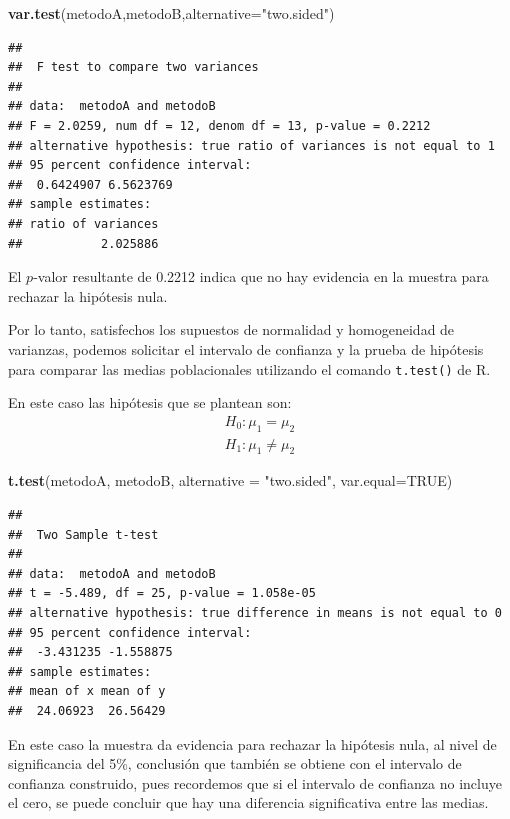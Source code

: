 \documentclass[
]{book}
\newenvironment{Shaded}{\begin{snugshade}}{\end{snugshade}}
\newcommand{\AttributeTok}[1]{\textcolor[rgb]{0.13,0.29,0.53}{#1}}
\newcommand{\ConstantTok}[1]{\textcolor[rgb]{0.56,0.35,0.01}{#1}}
\newcommand{\FunctionTok}[1]{\textcolor[rgb]{0.13,0.29,0.53}{\textbf{#1}}}
\newcommand{\NormalTok}[1]{#1}
\newcommand{\StringTok}[1]{\textcolor[rgb]{0.31,0.60,0.02}{#1}}
\begin{document}
\begin{Shaded}
\begin{Highlighting}[]
\FunctionTok{var.test}\NormalTok{(metodoA,metodoB,}\AttributeTok{alternative=}\StringTok{"two.sided"}\NormalTok{)}
\end{Highlighting}
\end{Shaded}

\begin{verbatim}
## 
##  F test to compare two variances
## 
## data:  metodoA and metodoB
## F = 2.0259, num df = 12, denom df = 13, p-value = 0.2212
## alternative hypothesis: true ratio of variances is not equal to 1
## 95 percent confidence interval:
##  0.6424907 6.5623769
## sample estimates:
## ratio of variances 
##           2.025886
\end{verbatim}

El \(p\)-valor resultante de 0.2212 indica que no hay evidencia en la muestra para rechazar la hipótesis nula.

Por lo tanto, satisfechos los supuestos de normalidad y homogeneidad de varianzas, podemos solicitar el intervalo de confianza y la prueba de hipótesis para comparar las medias poblacionales utilizando el comando \texttt{t.test()} de R.

En este caso las hipótesis que se plantean son:
\[\begin{matrix}
H_0:\mu_1=\mu_2\\
H_1:\mu_1\neq \mu_2
\end{matrix} \]

\begin{Shaded}
\begin{Highlighting}[]
\FunctionTok{t.test}\NormalTok{(metodoA, metodoB, }\AttributeTok{alternative =} \StringTok{"two.sided"}\NormalTok{, }\AttributeTok{var.equal=}\ConstantTok{TRUE}\NormalTok{)}
\end{Highlighting}
\end{Shaded}

\begin{verbatim}
## 
##  Two Sample t-test
## 
## data:  metodoA and metodoB
## t = -5.489, df = 25, p-value = 1.058e-05
## alternative hypothesis: true difference in means is not equal to 0
## 95 percent confidence interval:
##  -3.431235 -1.558875
## sample estimates:
## mean of x mean of y 
##  24.06923  26.56429
\end{verbatim}

En este caso la muestra da evidencia para rechazar la hipótesis nula, al nivel de significancia del 5\%, conclusión que también se obtiene con el intervalo de confianza construido, pues recordemos que si el intervalo de confianza no incluye el cero, se puede concluir que hay una diferencia significativa entre las medias.
\end{document}
